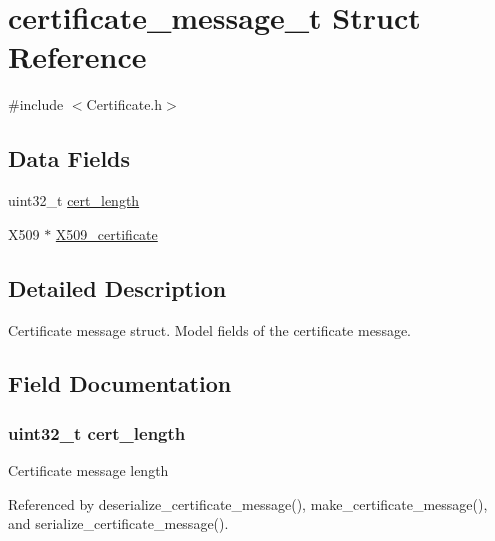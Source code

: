 \hypertarget{structcertificate__message__t}{}\section{certificate\+\_\+message\+\_\+t Struct Reference}
\label{structcertificate__message__t}


{\ttfamily \#include $<$Certificate.\+h$>$}

\subsection*{Data Fields}
\begin{DoxyCompactItemize}
\item 
uint32\+\_\+t \hyperlink{structcertificate__message__t_ab534aa9b18ddd479ee8603fd8a0e3e07}{cert\+\_\+length}
\item 
X509 $\ast$ \hyperlink{structcertificate__message__t_aa02d32568d177ce73429e6cff12fa7b2}{X509\+\_\+certificate}
\end{DoxyCompactItemize}


\subsection{Detailed Description}
Certificate message struct. Model fields of the certificate message. 

\subsection{Field Documentation}
\subsubsection[{\texorpdfstring{cert\+\_\+length}{cert_length}}]{\setlength{\rightskip}{0pt plus 5cm}uint32\+\_\+t cert\+\_\+length}\hypertarget{structcertificate__message__t_ab534aa9b18ddd479ee8603fd8a0e3e07}{}\label{structcertificate__message__t_ab534aa9b18ddd479ee8603fd8a0e3e07}
Certificate message length 

Referenced by deserialize\+\_\+certificate\+\_\+message(), make\+\_\+certificate\+\_\+message(), and serialize\+\_\+certificate\+\_\+message().

